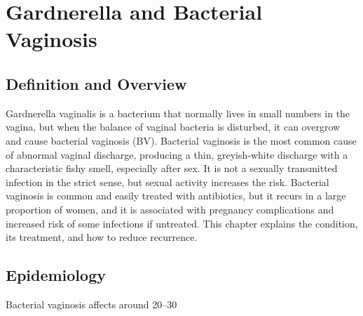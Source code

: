\chapter{Gardnerella and Bacterial Vaginosis}

\section*{Definition and Overview}
Gardnerella vaginalis is a bacterium that normally lives in small numbers in the vagina, but when the balance of vaginal bacteria is disturbed, it can overgrow and cause bacterial vaginosis (BV). Bacterial vaginosis is the most common cause of abnormal vaginal discharge, producing a thin, greyish-white discharge with a characteristic fishy smell, especially after sex. It is not a sexually transmitted infection in the strict sense, but sexual activity increases the risk. Bacterial vaginosis is common and easily treated with antibiotics, but it recurs in a large proportion of women, and it is associated with pregnancy complications and increased risk of some infections if untreated. This chapter explains the condition, its treatment, and how to reduce recurrence.

\section*{Epidemiology}
Bacterial vaginosis affects around 20--30%

